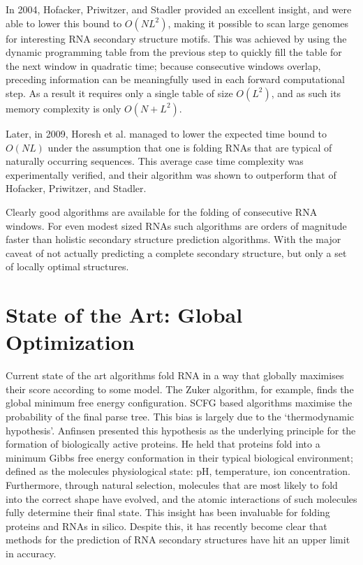 \documentclass{cshonours}
\begin{document}
In 2004, Hofacker, Priwitzer, and Stadler \cite{hofacker2004prediction} provided an excellent insight, and were
able to lower this bound to $O(NL^2)$, making it possible to scan large genomes
for interesting RNA secondary structure motifs. This was achieved by using the
dynamic programming table from the previous step to quickly fill the table for
the next window in quadratic time; because consecutive windows overlap, preceding information can be meaningfully used in each forward computational step.
As a result it requires only a single table of size $O(L^2)$, and as such its memory complexity is only $O(N + L^2)$.

Later, in 2009, Horesh et al. \cite{horesh2009rnaslider} managed
to lower the expected time bound to $O(NL)$ under the assumption that one is
folding RNAs that are typical of naturally occurring sequences. This average case time complexity was experimentally verified, and their algorithm was shown to outperform that of Hofacker, Priwitzer, and Stadler. 

Clearly good algorithms are
available for the folding of consecutive RNA windows. For even modest sized
RNAs such algorithms are orders of magnitude faster than holistic secondary
structure prediction algorithms. With the major caveat of not actually predicting
a complete secondary structure, but only a set of locally optimal structures.

\section{State of the Art: Global Optimization}
\label{sec:softa}
Current state of the art algorithms fold RNA in a way that globally maximises their score according to some model. The Zuker algorithm, for example, finds the global minimum free energy configuration. SCFG based algorithms maximise the probability of the final parse tree. This bias is largely due to the `thermodynamic hypothesis'. Anfinsen \cite{anfinsen1973principles} presented this hypothesis as the underlying principle for the formation of biologically active proteins. He held that proteins fold into a minimum Gibbs free energy conformation in their typical biological environment; defined as the molecules physiological state: pH, temperature, ion concentration. Furthermore, through natural selection, molecules that are most likely to fold into the correct shape have evolved, and the atomic interactions of such molecules fully determine their final state. This insight has been invaluable for folding proteins and RNAs in silico. Despite this, it has recently become clear that methods for the prediction of RNA secondary structures have hit an upper limit in accuracy.
\end{document}
